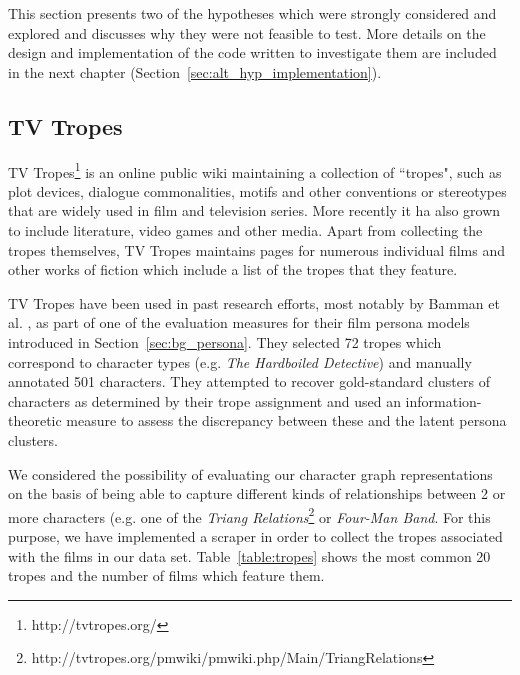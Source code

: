 \documentclass[bsc,frontabs,singlespacing,parskip, twoside]{infthesis}
\begin{document}
This section presents two of the hypotheses which were strongly considered and explored and discusses why they were not feasible to test. More details on the design and implementation of the code written to investigate them are included in the next chapter (Section~\ref{sec:alt_hyp_implementation}).

\subsection{TV Tropes}
TV Tropes\footnote{http://tvtropes.org/} is an online public wiki maintaining a collection of ``tropes", such as plot devices, dialogue commonalities, motifs and other conventions or stereotypes that are widely used in film and television series. More recently it ha also grown to include literature, video games and other media. Apart from collecting the tropes themselves, TV Tropes maintains pages for numerous individual films and other works of fiction which include a list of the tropes that they feature.

TV Tropes have been used in past research efforts, most notably by Bamman et al. \cite{Bamman2013}, as part of one of the evaluation measures for their film persona models introduced in Section~\ref{sec:bg_persona}. They selected 72 tropes which correspond to character types (e.g. \textit{The Hardboiled Detective}) and manually annotated 501 characters. They attempted to recover gold-standard clusters of characters as determined by their trope assignment and used an information-theoretic measure to assess the discrepancy between these and the latent persona clusters.

We considered the possibility of evaluating our character graph representations on the basis of being able to capture different kinds of relationships between 2 or more characters (e.g. one of the \textit{Triang Relations}\footnote{http://tvtropes.org/pmwiki/pmwiki.php/Main/TriangRelations} or \textit{Four-Man Band}. For this purpose, we have implemented a scraper in order to collect the tropes associated with the films in our data set. Table~\ref{table:tropes} shows the most common 20 tropes and the number of films which feature them.
\end{document}
